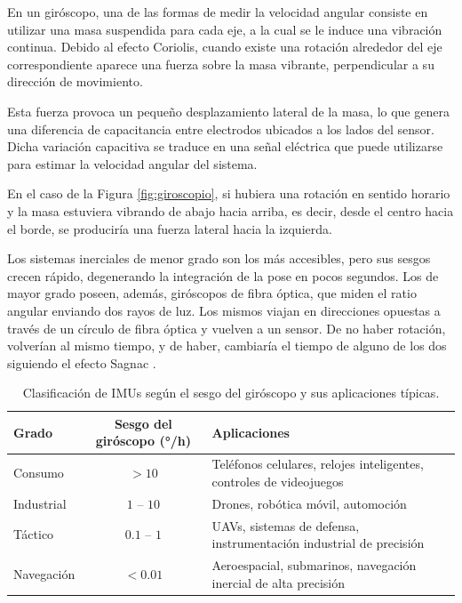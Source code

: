 En un giróscopo, una de las formas de medir la velocidad angular consiste en utilizar una masa suspendida para cada eje, a la cual se le induce una vibración continua. Debido al efecto Coriolis, cuando existe una rotación alrededor del eje correspondiente aparece una fuerza sobre la masa vibrante, perpendicular a su dirección de movimiento.

Esta fuerza provoca un pequeño desplazamiento lateral de la masa, lo que genera una diferencia de capacitancia entre electrodos ubicados a los lados del sensor. Dicha variación capacitiva se traduce en una señal eléctrica que puede utilizarse para estimar la velocidad angular del sistema.

En el caso de la Figura \ref{fig:giroscopio}, si hubiera una rotación en sentido horario y la masa estuviera vibrando de abajo hacia arriba, es decir, desde el centro hacia el borde, se produciría una fuerza lateral hacia la izquierda.



Los sistemas inerciales de menor grado son los más accesibles, pero sus sesgos crecen rápido, degenerando la integración de la pose en pocos segundos. Los de mayor grado poseen, además, giróscopos de fibra óptica, que miden el ratio angular enviando dos rayos de luz. Los mismos viajan en direcciones opuestas a través de un círculo de fibra óptica y vuelven a un sensor. De no haber rotación, volverían al mismo tiempo, y de haber, cambiaría el tiempo de alguno de los dos siguiendo el efecto Sagnac \cite{canalgeomatics_fiberopticgyros}.

\begin{table}[H]
\centering
\caption{Clasificación de IMUs según el sesgo del giróscopo y sus aplicaciones típicas.}
\label{tab:sesgos_imu}
\begin{tabular}{l c p{7cm}}
\toprule
\textbf{Grado} & \textbf{Sesgo del giróscopo (°/h)} & \textbf{Aplicaciones} \\
\midrule
Consumo      & $> 10$           & Teléfonos celulares, relojes inteligentes, controles de videojuegos \\
Industrial   & $1$ -- $10$       & Drones, robótica móvil, automoción \\
Táctico      & $0.1$ -- $1$      & UAVs, sistemas de defensa, instrumentación industrial de precisión \\
Navegación   & $< 0.01$          & Aeroespacial, submarinos, navegación inercial de alta precisión \\
\bottomrule
\end{tabular}
\end{table} 

